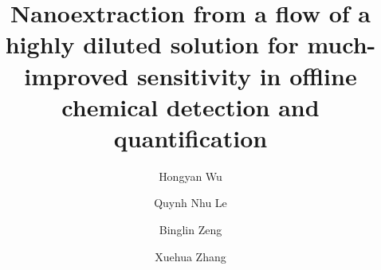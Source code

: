 \documentclass[a4paper,fleqn]{cas-dc}
\begin{document}
\begin{sloppypar}

\let\WriteBookmarks\relax
\def\floatpagepagefraction{1}
\def\textpagefraction{.001}

\title [mode = title]{Nanoextraction from a flow of a highly diluted solution for much-improved sensitivity in offline chemical detection and quantification}




\author[1]{Hongyan Wu}
\address[1]{Department of Chemical and Materials Engineering, University of Alberta, Alberta T6G 1H9, Canada}

\author[1]{Quynh Nhu Le}

\author[1]{Binglin Zeng}

\author[1,2]{Xuehua Zhang}
\cormark[1]
\address[2]{Physics of Fluids Group, Max Planck Center Twente for Complex Fluid Dynamics, JM
Burgers Center for Fluid Dynamics, Mesa+, Department of Science and Technology,
University of Twente, Enschede 7522 NB, The Netherlands}





\end{sloppypar}
\end{document}
